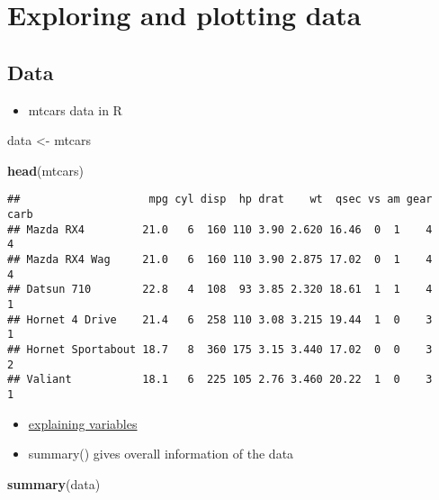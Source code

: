 \documentclass[
  a4paper,
]{article}
\newenvironment{Shaded}{\begin{snugshade}}{\end{snugshade}}
\newcommand{\FunctionTok}[1]{\textcolor[rgb]{0.13,0.29,0.53}{\textbf{#1}}}
\newcommand{\NormalTok}[1]{#1}
\newcommand{\OtherTok}[1]{\textcolor[rgb]{0.56,0.35,0.01}{#1}}
\providecommand{\tightlist}{%
  \setlength{\itemsep}{0pt}\setlength{\parskip}{0pt}}
\begin{document}
\section{Exploring and plotting data}\label{exploring-and-plotting-data}

\subsection{Data}\label{data-1}

\begin{itemize}
\tightlist
\item
  mtcars data in R
\end{itemize}

\begin{Shaded}
\begin{Highlighting}[]
\NormalTok{data }\OtherTok{\textless{}{-}}\NormalTok{ mtcars}

\FunctionTok{head}\NormalTok{(mtcars)}
\end{Highlighting}
\end{Shaded}

\begin{verbatim}
##                    mpg cyl disp  hp drat    wt  qsec vs am gear carb
## Mazda RX4         21.0   6  160 110 3.90 2.620 16.46  0  1    4    4
## Mazda RX4 Wag     21.0   6  160 110 3.90 2.875 17.02  0  1    4    4
## Datsun 710        22.8   4  108  93 3.85 2.320 18.61  1  1    4    1
## Hornet 4 Drive    21.4   6  258 110 3.08 3.215 19.44  1  0    3    1
## Hornet Sportabout 18.7   8  360 175 3.15 3.440 17.02  0  0    3    2
## Valiant           18.1   6  225 105 2.76 3.460 20.22  1  0    3    1
\end{verbatim}

\begin{itemize}
\item
  \href{https://rstudio-pubs-static.s3.amazonaws.com/61800_faea93548c6b49cc91cd0c5ef5059894.html}{explaining
  variables}
\item
  summary() gives overall information of the data
\end{itemize}

\begin{Shaded}
\begin{Highlighting}[]
\FunctionTok{summary}\NormalTok{(data)}
\end{Highlighting}
\end{Shaded}
\end{document}

